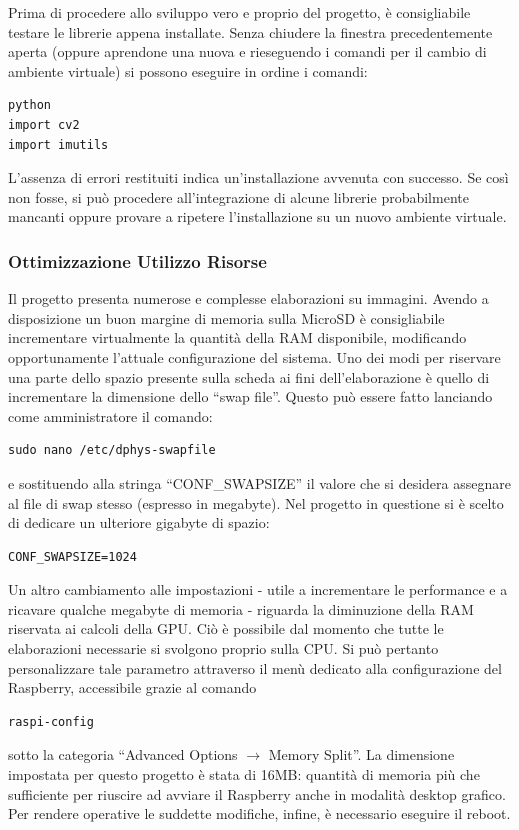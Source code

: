 \documentclass[12pt]{article}
\newcommand{\quotes}[1]{``#1''}
\begin{document}
\vspace{0.5cm}
Prima di procedere allo sviluppo vero e proprio del progetto, è consigliabile testare le librerie appena installate. Senza chiudere la finestra precedentemente aperta (oppure aprendone una nuova e rieseguendo i comandi per il cambio di ambiente virtuale) si possono eseguire in ordine i comandi:
\begin{lstlisting}
python
import cv2
import imutils
\end{lstlisting}
L'assenza di errori restituiti indica un'installazione avvenuta con successo. Se così non fosse, si può procedere all'integrazione di alcune librerie probabilmente mancanti oppure provare a ripetere l'installazione su un nuovo ambiente virtuale.

\subsubsection{Ottimizzazione Utilizzo Risorse}

Il progetto presenta numerose e complesse elaborazioni su immagini. Avendo a disposizione un buon margine di memoria sulla MicroSD è consigliabile incrementare virtualmente la quantità della RAM disponibile, modificando opportunamente l'attuale configurazione del sistema. Uno dei modi per riservare una parte dello spazio presente sulla scheda ai fini dell'elaborazione è quello di incrementare la dimensione dello \quotes{swap file}. Questo può essere fatto lanciando come amministratore il comando:
\begin{lstlisting}
sudo nano /etc/dphys-swapfile
\end{lstlisting}
e sostituendo alla stringa \quotes{CONF\_SWAPSIZE} il valore che si desidera assegnare al file di swap stesso (espresso in megabyte). Nel progetto in questione si è scelto di dedicare un ulteriore gigabyte di spazio:
\begin{lstlisting}
CONF_SWAPSIZE=1024
\end{lstlisting}
Un altro cambiamento alle impostazioni - utile a incrementare le performance e a ricavare qualche megabyte di memoria - riguarda la diminuzione della RAM riservata ai calcoli della GPU. Ciò è possibile dal momento che tutte le elaborazioni necessarie si svolgono proprio sulla CPU. Si può pertanto personalizzare tale parametro attraverso il menù dedicato alla configurazione del Raspberry, accessibile grazie al comando
\begin{lstlisting}
raspi-config
\end{lstlisting}
sotto la categoria \quotes{Advanced Options $\rightarrow$ Memory Split}. La dimensione impostata per questo progetto è stata di 16MB: quantità di memoria più che sufficiente per riuscire ad avviare il Raspberry anche in modalità desktop grafico. Per rendere operative le suddette modifiche, infine, è necessario eseguire il reboot.
\end{document}
